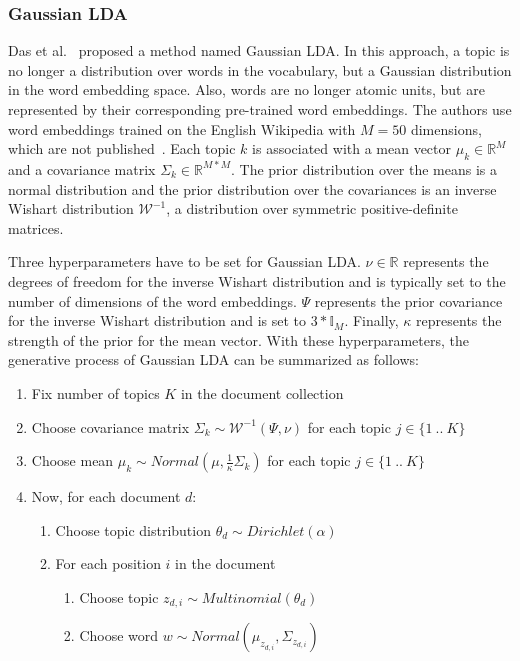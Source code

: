 \documentclass[
        a4paper,
        titlepage,
        twoside,
        parskip
        ]{scrbook}
\theoremstyle{break}
\begin{document}
\subsubsection{Gaussian LDA}
Das et al.~\cite{Das2015} proposed a method named Gaussian LDA.
In this approach, a topic is no longer a distribution over words in the vocabulary, but a Gaussian distribution in the word embedding space.
Also, words are no longer atomic units, but are represented by their corresponding pre-trained word embeddings.
The authors use word embeddings trained on the English Wikipedia with $M=50$ dimensions, which are not published~\cite{Das2016}.
Each topic $k$ is associated with a mean vector $\mu_k \in \mathbb{R}^{M}$ and a  covariance matrix $\Sigma_k \in \mathbb{R}^{M * M}$.
The prior distribution over the means is a normal distribution and the prior distribution over the covariances is an inverse Wishart distribution $\mathcal{W}^{-1}$, a distribution over symmetric positive-definite matrices.

Three hyperparameters have to be set for Gaussian LDA.
$\nu \in \mathbb{R}$ represents the degrees of freedom for the inverse Wishart distribution and is typically set to the number of dimensions of the word embeddings.
$\Psi$ represents the prior covariance for the inverse Wishart distribution and is set to $3 * \mathbb{I}_M$.
Finally, $\kappa$ represents the strength of the prior for the mean vector.
With these hyperparameters, the generative process of Gaussian LDA can be summarized as follows:
\begin{enumerate}
       \item Fix number of topics $K$ in the document collection
       \item Choose covariance matrix $\Sigma_k \sim \mathcal{W}^{-1}(\Psi, \nu)$ for each topic $j \in \{1~..~K\}$
       \item Choose mean $\mu_k \sim Normal(\mu, \frac{1}{\kappa} \Sigma_k)$ for each topic $j \in \{1~..~K\}$
       \item Now, for each document $d$:
       \begin{enumerate}
              \item Choose topic distribution $\theta_d \sim Dirichlet(\alpha)$
              \item For each position $i$ in the document
              \begin{enumerate}
                     \item Choose topic $z_{d,i} \sim Multinomial(\theta_d)$
                     \item Choose word $w \sim Normal(\mu_{z_{d,i}}, \Sigma_{z_{d,i}})$
              \end{enumerate}
       \end{enumerate}
\end{enumerate}
\end{document}
